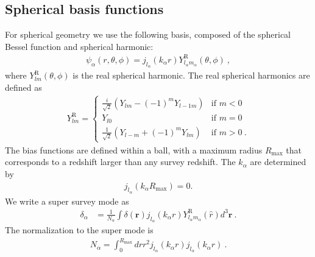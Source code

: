 \newcommand{\sph}[2]{Y^\text{R}_{l_#1 m_#1}(\hat{#2})}

\newcommand{\jl}[1]{j_{l_#1}}
\newcommand{\dk}{\frac{ d^3 \mathbf{k}}{(2 \pi)^3}} 
\newcommand{ \dkv}[1]{\frac{ d^3 \mathbf{k}_{#1}}{(2 \pi)^3}} 
\newcommand{\obs}{\mathcal{O}}

\subsection{Spherical basis functions}
For spherical geometry we use the following basis, composed of the spherical Bessel function and spherical harmonic:
\begin{align} 
\psi_\alpha(r, \theta, \phi) = j_{l_\alpha}(k_\alpha r) Y^\text{R}_{l_\alpha m_\alpha}(\theta, \phi) ~, 
\end{align} 
where $Y^\text{R}_{lm}(\theta, \phi) $ is the real spherical harmonic. The real spherical harmonics are defined as 
\begin{align}
Y^\text{R}_{lm} =
\begin{cases} \frac{i}{\sqrt{2}} \left( Y_{lm}  - (-1)^m Y_{l-1m} \right)& \text{if }  m < 0 \\
Y_{l0} & \text{if } m=0 \\
\frac{1}{\sqrt{2}}\left( Y_{l-m} + (-1)^mY_{lm}\right) & \text{if } m > 0 ~.
\end{cases}
\end{align} 
The bias functions are defined within a ball, with a maximum radius $R_\text{max}$ that corresponds to a redshift larger than any survey redshift.  The $k_\alpha$ are determined by \begin{align}
 j_{l_\alpha}(k_\alpha R_\text{max})=0.
\end{align}
We write a super survey mode as 
\begin{align}
\delta_\alpha& = \frac{1}{N_\alpha}  \int \delta(\mathbf{r}) \jl{\alpha}(k_\alpha r) \sph{\alpha}{r} d^3 \mathbf{r}~. 
\end{align}
The normalization to the super mode is 
\begin{align} 
N_\alpha= \int_0^{R_\text{max}} dr r^2 j_{l_\alpha} (k_\alpha r) j_{l_\alpha} (k_\alpha r) ~.
\end{align} 

